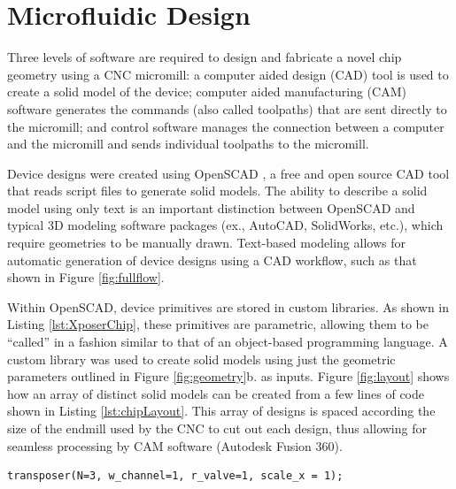 \section{Microfluidic Design}
\label{sec:mfDesign}

Three levels of software are required to design and fabricate a novel chip geometry using a CNC micromill: a computer aided design (CAD) tool is used to create a solid model of the device; computer aided manufacturing (CAM) software generates the commands (also called toolpaths) that are sent directly to the micromill; and control software manages the connection between a computer and the micromill and sends individual toolpaths to the micromill. 

Device designs were created using OpenSCAD \cite{wikiOpenScad}, a free and open source CAD tool that reads script files to generate solid models. The ability to describe a solid model using only text is an important distinction between OpenSCAD and typical 3D modeling software packages (ex., AutoCAD, SolidWorks, etc.), which require geometries to be manually drawn. Text-based modeling allows for automatic generation of device designs using a CAD workflow, such as that shown in Figure \ref{fig:fullflow}. 

Within OpenSCAD, device primitives are stored in custom libraries. As shown in Listing \ref{lst:XposerChip}, these primitives are parametric, allowing them to be ``called'' in a fashion similar to that of an object-based programming language. A custom library was used to create solid models using just the geometric parameters outlined in Figure \ref{fig:geometry}b. as inputs. Figure \ref{fig:layout} shows how an array of distinct solid models can be created from a few lines of code shown in Listing \ref{lst:chipLayout}. This array of designs is spaced according the size of the endmill used by the CNC to cut out each design, thus allowing for seamless processing by CAM software (Autodesk Fusion 360).


\begin{minipage}{0.99\linewidth}
\begin{lstlisting}[caption={Once a primitive is defined in OpenSCAD, the parameters associated with each device geometry can be modified and the corresponding solid model will adjust to reflect the changes.},label={lst:XposerChip}, frame=single, language=scad]
  transposer(N=3, w_channel=1, r_valve=1, scale_x = 1);
\end{lstlisting}
\end{minipage}


